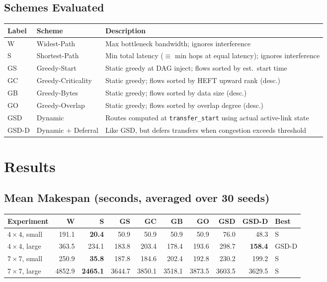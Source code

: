 \documentclass[11pt]{article}
\begin{document}
\subsection{Schemes Evaluated}

\begin{table}[h]
\centering
\small
\begin{tabular}{llp{7.5cm}}
\toprule
\textbf{Label} & \textbf{Scheme} & \textbf{Description} \\
\midrule
W     & Widest-Path        & Max bottleneck bandwidth; ignores interference \\
S     & Shortest-Path      & Min total latency ($\equiv$ min hops at equal latency); ignores interference \\
GS    & Greedy-Start       & Static greedy at DAG inject; flows sorted by est.\ start time \\
GC    & Greedy-Criticality & Static greedy; flows sorted by HEFT upward rank (desc.) \\
GB    & Greedy-Bytes       & Static greedy; flows sorted by data size (desc.) \\
GO    & Greedy-Overlap     & Static greedy; flows sorted by overlap degree (desc.) \\
GSD   & Dynamic            & Routes computed at \texttt{transfer\_start} using actual active-link state \\
GSD-D & Dynamic + Deferral & Like GSD, but defers transfers when congestion exceeds threshold \\
\bottomrule
\end{tabular}
\end{table}

\section{Results}

\subsection{Mean Makespan (seconds, averaged over 30 seeds)}

\begin{table}[h]
\centering
\small
\begin{tabular}{lrrrrrrrrl}
\toprule
\textbf{Experiment}
  & \textbf{W} & \textbf{S} & \textbf{GS} & \textbf{GC}
  & \textbf{GB} & \textbf{GO} & \textbf{GSD} & \textbf{GSD-D} & \textbf{Best} \\
\midrule
$4\times4$, small &  191.1 &  \textbf{20.4} &   50.9 &   50.9 &   50.9 &   50.9 &   76.0 &   48.3 & S     \\
$4\times4$, large &  363.5 &  234.1 &  183.8 &  203.4 &  178.4 &  193.6 &  298.7 & \textbf{158.4} & GSD-D \\
$7\times7$, small &  250.9 &  \textbf{35.8} &  187.8 &  184.6 &  202.4 &  192.8 &  230.2 &  199.2 & S     \\
$7\times7$, large & 4852.9 & \textbf{2465.1} & 3644.7 & 3850.1 & 3518.1 & 3873.5 & 3603.5 & 3629.5 & S     \\
\bottomrule
\end{tabular}
\end{table}
\end{document}
